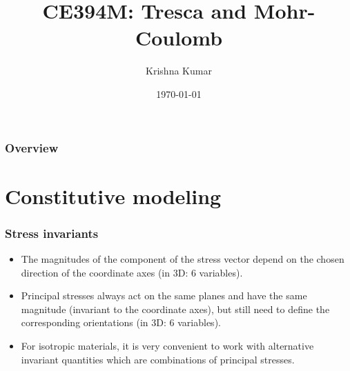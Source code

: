 \documentclass[notes]{beamer}
\title[CE394M: Tresca \& MC]{CE394M: Tresca and Mohr-Coulomb}
\author{Krishna Kumar} %
\institute[UT Austin] %
{
University of Texas at Austin \\
\medskip
\textit{
  \url{krishnak@utexas.edu}} %
}
\date{\today} %
\begin{document}
\begin{frame}
\titlepage %
\end{frame}

\begin{frame}
 \frametitle{Overview}
 \tableofcontents
\end{frame}

\section{Constitutive modeling}
\begin{frame}
\frametitle{Stress invariants}
\begin{itemize}
	\item The magnitudes of the component of the stress vector depend on the chosen direction of the coordinate axes (in 3D: 6 variables).
	\item Principal stresses always act on the same planes and have the same magnitude (invariant to the coordinate axes), but still need to define the corresponding orientations (in 3D: 6 variables).
	\item For isotropic materials, it is very convenient to work with alternative invariant quantities which are combinations of principal stresses.
\end{itemize}
\end{frame}
\end{document}
